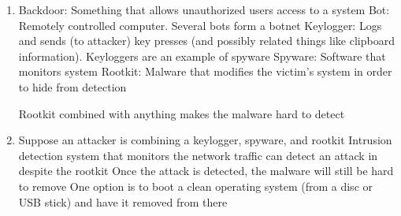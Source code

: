 \begin{enumerate}
\item %
  Backdoor: Something that allows unauthorized users access to a system
  Bot: Remotely controlled computer. Several bots form a botnet
  Keylogger: Logs and sends (to attacker) key presses (and possibly related things like clipboard information). Keyloggers are an example of spyware
  Spyware: Software that monitors system
  Rootkit: Malware that modifies the victim's system in order to hide from detection

  Rootkit combined with anything makes the malware hard to detect
\item %
  Suppose an attacker is combining a keylogger, spyware, and rootkit
Intrusion detection system that monitors the network traffic can detect an attack in despite the rootkit
Once the attack is detected, the malware will still be hard to remove
One option is to boot a clean operating system (from a disc or USB stick) and have it removed from there
  
\end{enumerate}
